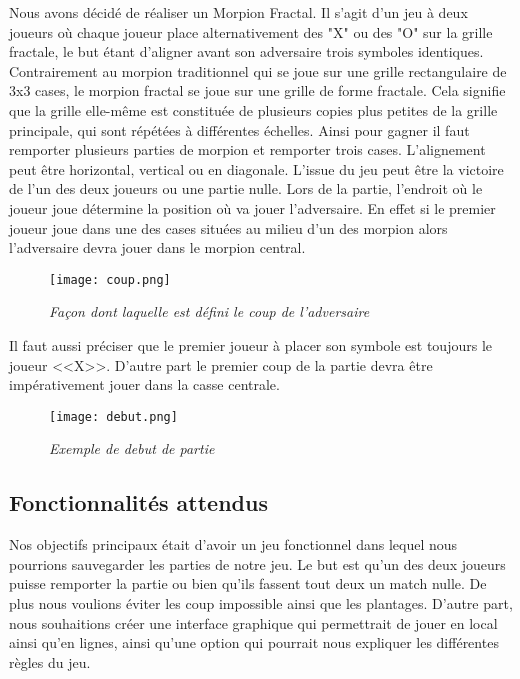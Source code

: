 \documentclass[12pt,a4paper]{article}
\begin{document}
    Nous avons décidé de réaliser un Morpion Fractal. Il s'agit d'un jeu à deux joueurs où chaque joueur place alternativement des "X" ou des "O" sur la grille fractale, le but étant d'aligner avant son adversaire trois symboles identiques. Contrairement au morpion traditionnel qui se joue sur une grille rectangulaire de 3x3 cases, le morpion fractal se joue sur une grille de forme fractale. Cela signifie que la grille elle-même est constituée de plusieurs copies plus petites de la grille principale, qui sont répétées à différentes échelles. Ainsi pour gagner il faut remporter plusieurs parties de morpion et remporter trois cases. L'alignement peut être horizontal, vertical ou en diagonale. L'issue du jeu peut être la victoire de l'un des deux joueurs ou une partie nulle.
    Lors de la partie, l'endroit où le joueur joue détermine la position où va jouer l'adversaire. En effet si le premier joueur joue dans une des cases situées au milieu d'un des morpion alors l'adversaire devra jouer dans le morpion central.
    \begin{figure}[h!]
    \begin{center}
    \texttt{[image: coup.png]}\\
    \caption{{\emph{Façon dont laquelle est défini le coup de l'adversaire}}}
    \label{Regroupement (ou clustering)}
    \end{center}
    \end{figure}
    \newpage
    Il faut aussi préciser que le premier joueur à placer son symbole est toujours le joueur <<X>>. D'autre part le premier coup de la partie devra  être impérativement jouer dans la casse centrale.

    \begin{figure}[h!]
    \begin{center}
    \texttt{[image: debut.png]}\\
    \caption{{\emph{Exemple de debut de partie}}}
    \label{Regroupement (ou clustering)}
    \end{center}
    \end{figure}
\newpage
    \subsection{Fonctionnalités attendus}
    Nos objectifs principaux était d'avoir un jeu fonctionnel dans lequel nous pourrions sauvegarder les parties de notre jeu. Le but est qu'un des deux joueurs puisse remporter la partie ou bien qu'ils fassent tout deux un match nulle. De plus nous voulions éviter les coup impossible ainsi que les plantages.
    D'autre part, nous souhaitions créer une interface graphique qui permettrait de jouer en local ainsi qu'en lignes, ainsi qu'une option qui pourrait nous expliquer les différentes règles du jeu.
\end{document}
